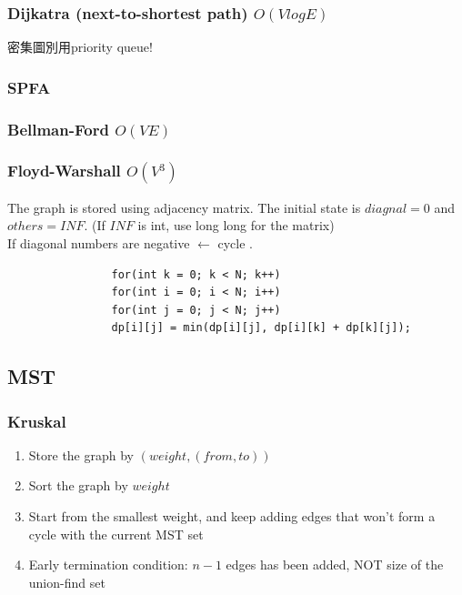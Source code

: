 \documentclass[10pt,oneside]{article}
\begin{document}
\begin{landscape}
\begin{multicols}{2}
				
				\subsubsection{Dijkatra (next-to-shortest path) $O(VlogE)$}
				{\normalsize 密集圖別用priority queue! }
				
				\subsubsection{SPFA}
				
				\subsubsection{Bellman-Ford $O(VE)$}
				
				\subsubsection{Floyd-Warshall $O(V^3)$}
				{\normalsize 
					The graph is stored using adjacency matrix. The initial state is $diagnal = 0$ and $others = INF$. (If $INF$ is int, use long long for the matrix)\\
					If diagonal numbers are negative $\leftarrow$ cycle . \\
				}
				
				\begin{verbatim}
				for(int k = 0; k < N; k++)
				for(int i = 0; i < N; i++)
				for(int j = 0; j < N; j++)
				dp[i][j] = min(dp[i][j], dp[i][k] + dp[k][j]);
				\end{verbatim}
				
				\subsection{MST}
				
				\subsubsection{Kruskal}
				
				{\normalsize 
					\begin{enumerate}
						\item Store the graph by $(weight, (from , to))$
						\item Sort the graph by $weight$ 
						\item Start from the smallest weight, and keep adding edges that won't form a cycle with the current MST set
						\item Early termination condition: $n - 1$ edges has been added, NOT size of the union-find set
					\end{enumerate}
				}
				

\end{multicols}
\end{landscape}
\end{document}
